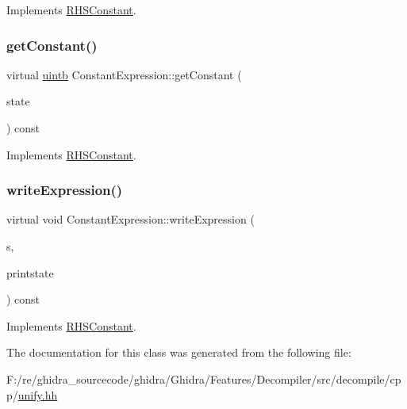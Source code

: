 Implements \mbox{\hyperlink{class_r_h_s_constant_a3e43335a89351a453932a8c0544d5722}{R\+H\+S\+Constant}}.

\mbox{\label{class_constant_expression_a13ee63bd84e93851cb1d756be49cc64d}} 
\subsubsection{\texorpdfstring{getConstant()}{getConstant()}}
{\footnotesize\ttfamily virtual \mbox{\hyperlink{types_8h_a2db313c5d32a12b01d26ac9b3bca178f}{uintb}} Constant\+Expression\+::get\+Constant (\begin{DoxyParamCaption}\item[{\mbox{\hyperlink{class_unify_state}{Unify\+State}} \&}]{state }\end{DoxyParamCaption}) const\hspace{0.3cm}{\ttfamily [virtual]}}



Implements \mbox{\hyperlink{class_r_h_s_constant_a941b5d2898cbce985a3ef9c5db6fa458}{R\+H\+S\+Constant}}.

\mbox{\label{class_constant_expression_a11af0fadc7f85c3a09431ef92e788870}} 
\subsubsection{\texorpdfstring{writeExpression()}{writeExpression()}}
{\footnotesize\ttfamily virtual void Constant\+Expression\+::write\+Expression (\begin{DoxyParamCaption}\item[{ostream \&}]{s,  }\item[{\mbox{\hyperlink{class_unify_c_printer}{Unify\+C\+Printer}} \&}]{printstate }\end{DoxyParamCaption}) const\hspace{0.3cm}{\ttfamily [virtual]}}



Implements \mbox{\hyperlink{class_r_h_s_constant_a79e03c6da5320e24873a4fee25f91411}{R\+H\+S\+Constant}}.



The documentation for this class was generated from the following file\+:\begin{DoxyCompactItemize}
\item 
F\+:/re/ghidra\+\_\+sourcecode/ghidra/\+Ghidra/\+Features/\+Decompiler/src/decompile/cpp/\mbox{\hyperlink{unify_8hh}{unify.\+hh}}\end{DoxyCompactItemize}
